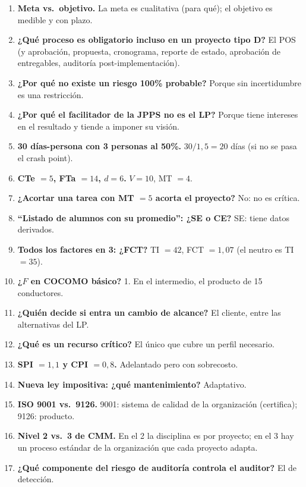 \documentclass[11pt,a4paper]{article}
\begin{document}
\begin{enumerate}\small
  \item \textbf{Meta vs.\ objetivo.} La meta es cualitativa (para qué); el objetivo es medible y con plazo.
  \item \textbf{¿Qué proceso es obligatorio incluso en un proyecto tipo D?} El POS (y aprobación, propuesta,
  cronograma, reporte de estado, aprobación de entregables, auditoría post-implementación).
  \item \textbf{¿Por qué no existe un riesgo 100\% probable?} Porque sin incertidumbre es una restricción.
  \item \textbf{¿Por qué el facilitador de la JPPS no es el LP?} Porque tiene intereses en el resultado y
  tiende a imponer su visión.
  \item \textbf{30 días-persona con 3 personas al 50\%.} $30/1{,}5 = 20$ días (si no se pasa el crash point).
  \item \textbf{CTe $=5$, FTa $=14$, $d=6$.} $V=10$, MT $=4$.
  \item \textbf{¿Acortar una tarea con MT $=5$ acorta el proyecto?} No: no es crítica.
  \item \textbf{``Listado de alumnos con su promedio'': ¿SE o CE?} SE: tiene datos derivados.
  \item \textbf{Todos los factores en 3: ¿FCT?} TI $=42$, FCT $=1{,}07$ (el neutro es TI $= 35$).
  \item \textbf{¿$F$ en COCOMO básico?} 1. En el intermedio, el producto de 15 conductores.
  \item \textbf{¿Quién decide si entra un cambio de alcance?} El cliente, entre las alternativas del LP.
  \item \textbf{¿Qué es un recurso crítico?} El único que cubre un perfil necesario.
  \item \textbf{SPI $=1{,}1$ y CPI $=0{,}8$.} Adelantado pero con sobrecosto.
  \item \textbf{Nueva ley impositiva: ¿qué mantenimiento?} Adaptativo.
  \item \textbf{ISO 9001 vs.\ 9126.} 9001: sistema de calidad de la organización (certifica); 9126: producto.
  \item \textbf{Nivel 2 vs.\ 3 de CMM.} En el 2 la disciplina es por proyecto; en el 3 hay un proceso estándar
  de la organización que cada proyecto adapta.
  \item \textbf{¿Qué componente del riesgo de auditoría controla el auditor?} El de detección.
\end{enumerate}
\end{document}
